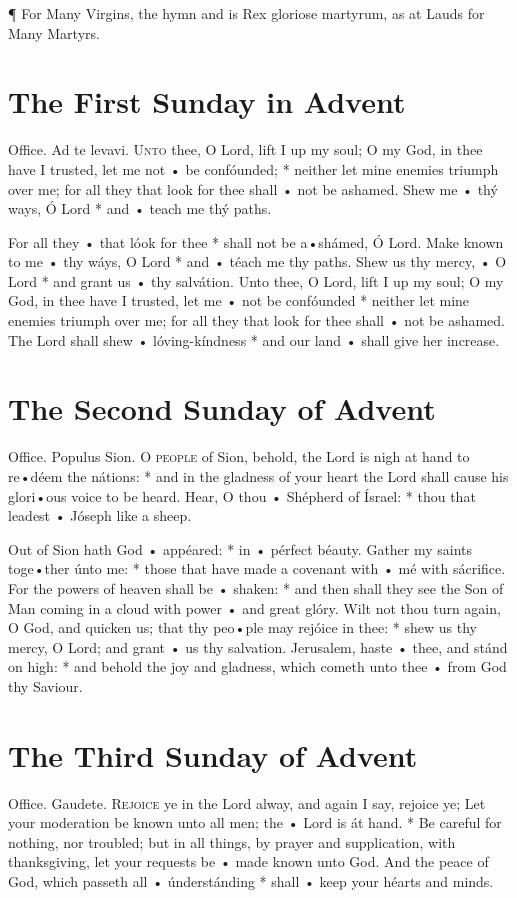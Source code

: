 ¶ For Many Virgins, the hymn and \V is {Rex gloriose martyrum}, as at Lauds for Many Martyrs.




\section{The First Sunday in Advent}

Office. Ad te levavi.
\lettrine{U}{nto} thee, O Lord, lift I up my soul; O my God, in thee have I trusted, let me not • be confóunded; * neither let mine enemies triumph over me; for all they that look for thee shall • not be ashamed.  Shew me • thý ways, Ó Lord * and • teach me thý paths.

 For all they • that lóok for thee * shall not be a•shámed, Ó Lord.  \V Make known to me • thy wáys, O Lord * and • téach me thy paths.   \V Shew us thy mercy, • O Lord * and grant us • thy salvátion.    Unto thee, O Lord, lift I up my soul; O my God, in thee have I trusted, let me • not be confóunded * neither let mine enemies triumph over me; for all they that look for thee shall • not be ashamed.   The Lord shall shew • lóving-kíndness * and our land • shall give her increase.

\section{The Second Sunday of Advent}
Office. Populus Sion.
\lettrine{O}{ people} of Sion, behold, the Lord is nigh at hand to re•déem the nátions: * and in the gladness of your heart the Lord shall cause his glori•ous voice to be heard.   Hear, O thou • Shépherd of Ísrael: * thou that leadest • Jóseph like a sheep.

 Out of Sion hath God • appéared: * in • pérfect béauty.  \V Gather my saints toge•ther únto me: * those that have made a covenant with • mé with sácrifice.   \V For the powers of heaven shall be • shaken: * and then shall they see the Son of Man coming in a cloud with power • and great glóry.  Wilt not thou turn again, O God, and quicken us; that thy peo•ple may rejóice in thee: * shew us thy mercy, O Lord; and grant • us thy salvation.   Jerusalem, haste • thee, and stánd on high: * and behold the joy and gladness, which cometh unto thee • from God thy Saviour.


\section{The Third Sunday of Advent}
Office. Gaudete.
\lettrine{R}{ejoice} ye in the Lord alway, and again I say, rejoice ye;   Let your moderation be known unto all men; the • Lord is át hand. * Be careful for nothing, nor troubled; but in all things, by prayer and supplication, with thanksgiving, let your requests be • made known unto God.   And the peace of God, which passeth all • únderstánding * shall • keep your héarts and minds.

